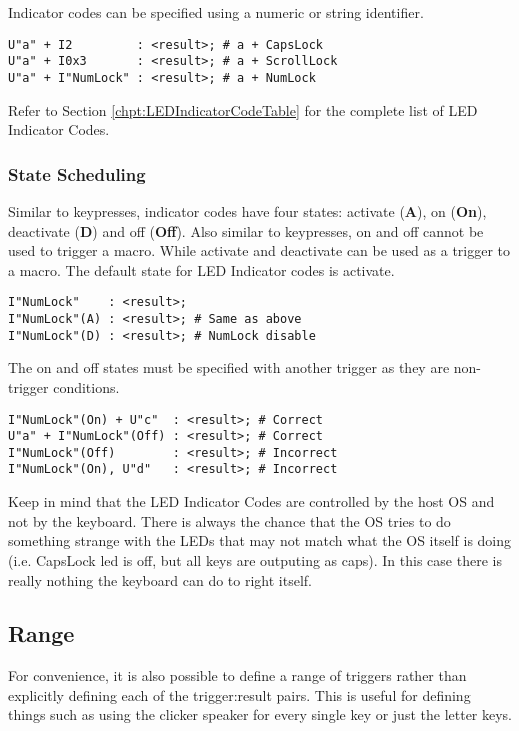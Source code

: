 \documentclass{kiibohd-template}
\begin{document}
Indicator codes can be specified using a numeric or string identifier.

\begin{lstlisting}
U"a" + I2         : <result>; # a + CapsLock
U"a" + I0x3       : <result>; # a + ScrollLock
U"a" + I"NumLock" : <result>; # a + NumLock
\end{lstlisting}

Refer to Section \ref{chpt:LEDIndicatorCodeTable} for the complete list of LED Indicator Codes.


\subsubsection{State Scheduling}

Similar to keypresses, indicator codes have four states: activate (\textbf{A}), on (\textbf{On}), deactivate (\textbf{D}) and off (\textbf{Off}).
Also similar to keypresses, on and off cannot be used to trigger a macro.
While activate and deactivate can be used as a trigger to a macro.
The default state for LED Indicator codes is activate.

\begin{lstlisting}
I"NumLock"    : <result>;
I"NumLock"(A) : <result>; # Same as above
I"NumLock"(D) : <result>; # NumLock disable
\end{lstlisting}

The on and off states must be specified with another trigger as they are non-trigger conditions.

\begin{lstlisting}
I"NumLock"(On) + U"c"  : <result>; # Correct
U"a" + I"NumLock"(Off) : <result>; # Correct
I"NumLock"(Off)        : <result>; # Incorrect
I"NumLock"(On), U"d"   : <result>; # Incorrect
\end{lstlisting}

Keep in mind that the LED Indicator Codes are controlled by the host OS and not by the keyboard.
There is always the chance that the OS tries to do something strange with the LEDs that may not match what the OS itself is doing (i.e. CapsLock led is off, but all keys are outputing as caps).
In this case there is really nothing the keyboard can do to right itself.


\subsection{Range}

For convenience, it is also possible to define a range of triggers rather than explicitly defining each of the trigger:result pairs.
This is useful for defining things such as using the clicker speaker for every single key or just the letter keys.
\end{document}
